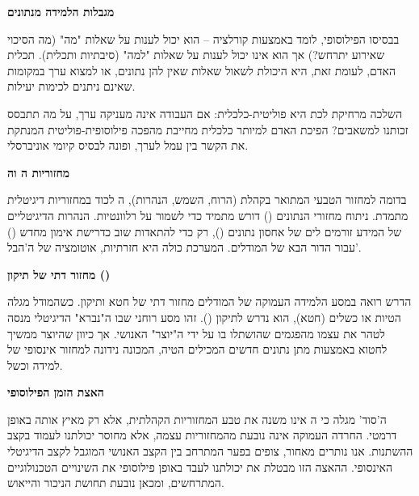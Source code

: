 \textbf{ מגבלות הלמידה מנתונים}

בבסיסו הפילוסופי,  לומד באמצעות קורלציה – הוא יכול לענות על שאלות "מה" (מה הסיכוי שאירוע  יתרחש?) אך הוא אינו יכול לענות על שאלות "למה" (סיבתיות ותכלית). תכלית האדם, לעומת זאת, היא היכולת לשאול שאלות שאין להן נתונים, או למצוא ערך במקומות שאינם ניתנים לכימות יעילות.

השלכה מרחיקת לכת היא פוליטית-כלכלית: אם העבודה אינה מעניקה ערך, על מה תתבסס זכותנו למשאבים? הפיכת האדם למיותר כלכלית מחייבת מהפכה פילוסופית-פוליטית המנתקת את הקשר בין עמל לערך, ופונה לבסיס קיומי אוניברסלי.


\textbf{ מחזוריות ה וה}

בדומה למחזור הטבעי המתואר בקהלת (הרוח, השמש, הנהרות), ה לכוד במחזוריות דיגיטלית מתמדת. ניתוח מחזורי הנתונים () דורש  מתמיד כדי לשמור על רלוונטיות. הנהרות הדיגיטליים של המידע זורמים לים של אחסון נתונים (), רק כדי להתאדות שוב כדרישת אימון מחדש () עבור הדור הבא של המודלים. המערכת כולה היא חזרתיות, אוטומציה של ה'הבל'.

\textbf{ מחזור דתי של תיקון ()}

הדרש רואה במסע הלמידה העמוקה של המודלים מחזור דתי של חטא ותיקון. כשהמודל מגלה הטיות או כשלים (חטא), הוא נדרש לתיקון (). זהו מסע רוחני שבו ה"נברא" הדיגיטלי מנסה לטהר את עצמו מהפגמים שהושתלו בו על ידי ה"יוצר" האנושי. אך כיוון שהיוצר ממשיך לחטוא באמצעות מתן נתונים חדשים המכילים הטיה, המכונה נידונה למחזור אינסופי של למידה וכשל.

\textbf{ האצת הזמן הפילוסופי}

ה'סוד' מגלה כי ה אינו משנה את טבע המחזוריות הקהלתית, אלא רק מאיץ אותה באופן דרמטי. החרדה העמוקה אינה נובעת מהמחזוריות עצמה, אלא מחוסר יכולתנו לעמוד בקצב ההשתנות. אנו נותרים מאחור, צופים בפער המתרחב בין הקצב האנושי המוגבל לקצב הדיגיטלי האינסופי. ההאצה הזו מבטלת את יכולתנו לעבד באופן פילוסופי את השינויים הטכנולוגיים המתרחשים, ומכאן נובעת תחושת הניכור והייאוש.
